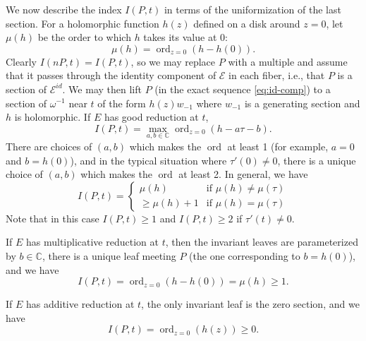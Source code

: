 \documentclass[12pt,reqno]{amsart}
\numberwithin{equation}{section}
\theoremstyle{plain}
\theoremstyle{definition}
\theoremstyle{remark}
\newcommand{\EE}{\mathcal{E}}
\newcommand{\C}{\mathbb{C}}
\newcommand{\<}{\langle}
\renewcommand{\>}{\rangle}
\DeclareMathOperator{\ord}{ord}
\numberwithin{equation}{section}
\begin{document}
We now describe the index $I(P,t)$ in terms of the uniformization of
the last section.  For a holomorphic function $h(z)$ defined on a disk
around $z=0$, let $\mu(h)$ be the order to which $h$ takes its value
at 0:
\[\mu(h)=\ord_{z=0}\left(h-h(0)\right).\]
Clearly $I(nP,t)=I(P,t)$, so we may replace $P$ with a multiple and
assume that it passes through the identity component of $\EE$ in each
fiber, i.e., that $P$ is a section of $\EE^{id}$.  We may then lift
$P$ (in the exact sequence \eqref{eq:id-comp}) to a section of
$\omega^{-1}$ near $t$ of the form $h(z)w_{-1}$ where $w_{-1}$ is a
generating section and $h$ is holomorphic.  If $E$ has good reduction
at $t$,
\[I(P,t)=\max_{a,b\in\C}\ord_{z=0}\left(h-a\tau-b\right).\]
There are choices of $(a,b)$ which makes the $\ord$ at least 1 (for
example, $a=0$ and $b=h(0)$), and in the typical situation where
$\tau'(0)\neq0$, there is a unique choice of $(a,b)$ which makes the
$\ord$ at least 2.  In general, we have
\[I(P,t)=
  \begin{cases}
    \mu(h)&\text{if $\mu(h)\neq\mu(\tau)$}\\
    \ge\mu(h)+1&\text{if $\mu(h)=\mu(\tau)$}
  \end{cases}\]
Note that in this case $I(P,t)\ge1$  and $I(P,t)\ge2$ if $\tau'(t)\neq0$.

If $E$ has multiplicative reduction at $t$, then the invariant leaves
are parameterized by $b\in\C$, there is a unique leaf meeting $P$ (the
one corresponding to $b=h(0)$), and we have
\[I(P,t)=\ord_{z=0}\left(h-h(0)\right)=\mu(h)\ge1.\]

If $E$ has additive reduction at $t$, the only invariant leaf is the
zero section, and we have
\[I(P,t)=\ord_{z=0}\left(h(z)\right)\ge0.\]
\end{document}
